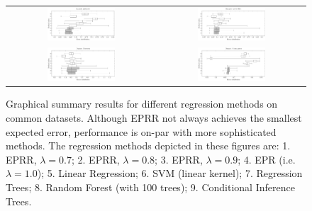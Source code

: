 \documentclass[review,preprint]{elsarticle}
\begin{document}
\begin{figure}[tb]\begin{center}
\begin{tabular}{cc}
\includegraphics[width=0.48\textwidth]{Fig3a.pdf}
&
\includegraphics[width=0.48\textwidth]{Fig3b.pdf}
\\
\includegraphics[width=0.48\textwidth]{Fig3c.pdf}
&
\includegraphics[width=0.48\textwidth]{Fig3d.pdf}
\end{tabular}
%
\caption{Graphical summary results for different regression methods on common datasets. Although \ac{EPRR} not always achieves the smallest expected error, performance is on-par with more sophisticated methods.  The regression methods depicted in these figures are:
1. \ac{EPRR}, $\lambda = 0.7$;
2. \ac{EPRR}, $\lambda = 0.8$;
3. \ac{EPRR}, $\lambda = 0.9$;
4. \ac{EPR} (i.e. $\lambda = 1.0$);
5. Linear Regression;
6. \ac{SVM} (linear kernel);
7. Regression Trees;
8. Random Forest (with 100 trees);
9. Conditional Inference Trees.}
\label{fig:four.datasets.summary}
\label{Housing_dataset_lambda0.8_25runs}
\label{Abalone_dataset_lambda0.8_25runs}
\label{Auto-Mpg_dataset_lambda0.8_25runs}
\label{Kinematics300_lambda0.8_25runs}
\end{center}\end{figure}
\end{document}
